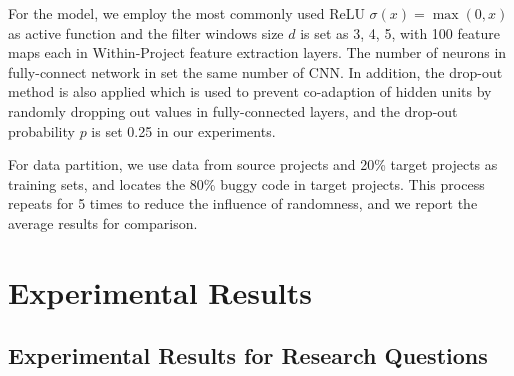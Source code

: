 For the \TRANPCNN model, we employ the most commonly used ReLU $\sigma(x)=\max(0,x)$ as active function and the filter windows size $d$ is set as 3, 4, 5, with 100 feature maps each in Within-Project feature extraction layers. The number of neurons in fully-connect network in  set the same number of CNN. In addition, the drop-out method is also applied which is used to prevent co-adaption of hidden units by randomly dropping out values in fully-connected layers, and the drop-out probability $p$ is set 0.25 in our experiments.

For data partition, we use data from source projects and 20\% target projects as training sets, and locates the 80\% buggy code in target projects. This process repeats for 5 times to reduce the influence of randomness, and we report the average results for comparison. 

\section{Experimental Results}

\subsection{Experimental Results for Research Questions}


